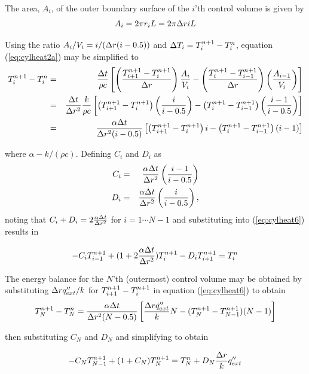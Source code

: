 \noindent The area, $A_i$, of the outer boundary surface of the $i$'th
control volume is given by
\begin{eqnarray*}
A_i=2\pi r_iL
=2\pi \Delta r iL
\label{eq:cylheat4}
\end{eqnarray*}

\noindent Using the ratio $A_i/V_i=i/(\Delta r(i-0.5))$
and $\Delta T_i=T_{i}^{n+1}-T_i^n$,
equation (\ref{eq:cylheat2a}) may be simplified to
\begin{eqnarray}
T_{i}^{n+1}-T_i^n&=&\frac{\Delta t}{\rho c}
\left[
\left(\frac{T_{i+1}^{n+1}-T_{i}^{n+1}}{\Delta r}\right)
\frac{A_i}{V_i}-
\left(\frac{T_{i}^{n+1}-T_{i-1}^{n+1}}{\Delta r}\right)
\left(\frac{A_{i-1}}{V_i}\right)
\right]
\nonumber\\
&=&\frac{\Delta t}{\Delta r^2}\frac{k}{\rho c}
\left[
\left(T_{i+1}^{n+1}-T_{i}^{n+1}\right)
\left(\frac{i}{i-0.5}\right)-
\left(T_{i}^{n+1}-T_{i-1}^{n+1}\right)
\left(\frac{i-1}{i-0.5}\right)
\right]\nonumber\\
&=&\frac{\alpha\Delta t}{\Delta r^2(i-0.5)}
\left[
\left(T_{i+1}^{n+1}-T_{i}^{n+1}\right)
i-
\left(T_{i}^{n+1}-T_{i-1}^{n+1}\right)
(i-1)
\right]
\label{eq:cylheat6}
\end{eqnarray}

\noindent where $\alpha-k/(\rho c)$.  Defining $C_i$ and $D_i$ as
\begin{eqnarray*}
C_i&=&\frac{\alpha\Delta t}{\Delta r^2}\left(\frac{i-1}{i-0.5}\right)\\
D_i&=&\frac{\alpha\Delta t}{\Delta r^2}\left(\frac{i}{i-0.5}\right),\\
\end{eqnarray*}
\noindent noting that $C_i+D_i=2\frac{\alpha\Delta t}{\Delta r^2}$
for $i=1\cdots N-1$ and
substituting into (\ref{eq:cylheat6}) results in

\begin{equation}
-C_iT_{i-1}^{n+1}+(1+2\frac{\alpha\Delta t}{\Delta r^2})T_{i}^{n+1}-D_iT_{i+1}^{n+1}=T_i^n
\label{eq:cylheat8}
\end{equation}

\noindent The energy balance for the $N$'th (outermost) control volume may
be obtained by substituting $\Delta r q''_{ext}/k$ for $T_{i+1}^{n+1}-T_{i}^{n+1}$ in
equation (\ref{eq:cylheat6}) to obtain
\begin{eqnarray*}
T_N^{n+1}-T_N^n=\frac{\alpha\Delta t}{\Delta r^2(N-0.5)}
\left[\frac{\Delta r\dot{q}''_{ext}}{k}N-(T_N^{n+1}-T_{N-1}^{n+1})(N-1)\right]
\end{eqnarray*}

\noindent then substituting $C_N$ and $D_N$ and simplifying
to obtain

\begin{equation}
-C_NT_{N-1}^{n+1}+(1+C_N)T_N^{n+1}=T_N^n+D_N\frac{\Delta r}{k}q''_{ext}
\label{eq:cylheat10}
\end{equation}

